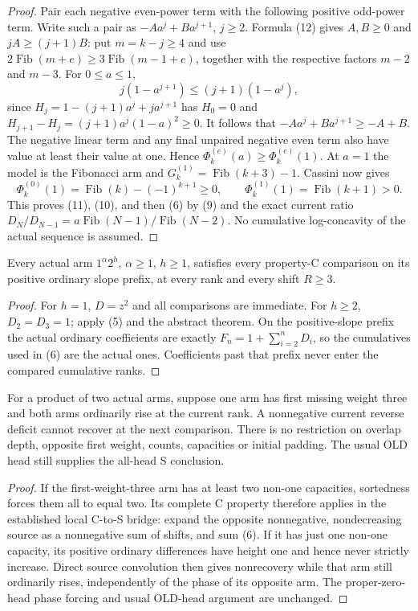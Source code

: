 \begin{proof}
Pair each negative even-power term with the following positive
odd-power term.  Write such a pair as $-A a^j+B a^{j+1}$,
$j\ge2$.  Formula (12) gives $A,B\ge0$ and $jA\ge(j+1)B$:
put $m=k-j\ge4$ and use
$2\operatorname{Fib}(m+e)\ge3\operatorname{Fib}(m-1+e)$,
together with the respective factors $m-2$ and $m-3$.
For $0\le a\le1$,
\[
 j(1-a^{j+1})\le(j+1)(1-a^j),
\]
since $H_j=1-(j+1)a^j+ja^{j+1}$ has $H_0=0$ and
$H_{j+1}-H_j=(j+1)a^j(1-a)^2\ge0$.
It follows that $-A a^j+B a^{j+1}\ge-A+B$.
The negative linear term and any final unpaired negative even
term also have value at least their value at one.  Hence
$\Phi^{(e)}_k(a)\ge\Phi^{(e)}_k(1)$.
At $a=1$ the model is the Fibonacci arm and
$G^{(1)}_k=\operatorname{Fib}(k+3)-1$.  Cassini now gives
\[
 \Phi^{(0)}_k(1)=\operatorname{Fib}(k)-(-1)^{k+1}\ge0,
 \qquad \Phi^{(1)}_k(1)=\operatorname{Fib}(k+1)>0.
\]
This proves (11), (10), and then (6) by (9) and the exact
current ratio $D_N/D_{N-1}=a\operatorname{Fib}(N-1)/
\operatorname{Fib}(N-2)$.  No cumulative log-concavity of
the actual sequence is assumed.
\end{proof}

\begin{theorem}
Every actual arm $1^\alpha2^h$, $\alpha\ge1$, $h\ge1$,
satisfies every property-C comparison on its positive ordinary
slope prefix, at every rank and every shift $R\ge3$.
\end{theorem}
\begin{proof}
For $h=1$, $D=z^2$ and all comparisons are immediate.
For $h\ge2$, $D_2=D_3=1$; apply (5) and the abstract theorem.
On the positive-slope prefix the actual ordinary coefficients
are exactly $F_n=1+\sum_{i=2}^nD_i$, so the cumulatives used
in (6) are the actual ones.  Coefficients past that prefix never
enter the compared cumulative ranks.
\end{proof}

\begin{corollary}
For a product of two actual arms, suppose one arm has first
missing weight three and both arms ordinarily rise at the current
rank.  A nonnegative current reverse deficit cannot recover at
the next comparison.  There is no restriction on overlap depth,
opposite first weight, counts, capacities or initial padding.
The usual OLD head still supplies the all-head S conclusion.
\end{corollary}
\begin{proof}
If the first-weight-three arm has at least two non-one capacities,
sortedness forces them all to equal two.  Its complete C property
therefore applies in the established local C-to-S bridge: expand
the opposite nonnegative, nondecreasing source as a nonnegative
sum of shifts, and sum (6).  If it has just one non-one capacity,
its positive ordinary differences have height one and hence
never strictly increase.  Direct source convolution then gives
nonrecovery while that arm still ordinarily rises, independently
of the phase of its opposite arm.  The proper-zero-head phase
forcing and usual OLD-head argument are unchanged.
\end{proof}

